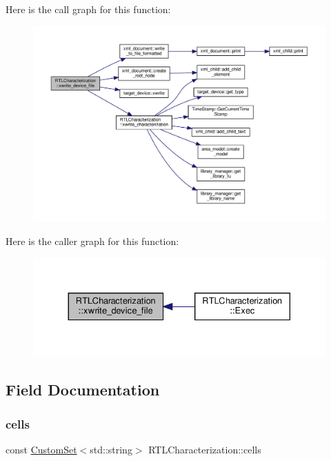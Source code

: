 Here is the call graph for this function\+:
\nopagebreak
\begin{figure}[H]
\begin{center}
\leavevmode
\includegraphics[width=350pt]{d9/d84/classRTLCharacterization_a2478484e956bec25a282ede5faaeaa88_cgraph}
\end{center}
\end{figure}
Here is the caller graph for this function\+:
\nopagebreak
\begin{figure}[H]
\begin{center}
\leavevmode
\includegraphics[width=330pt]{d9/d84/classRTLCharacterization_a2478484e956bec25a282ede5faaeaa88_icgraph}
\end{center}
\end{figure}


\subsection{Field Documentation}
\mbox{\label{classRTLCharacterization_afbefdea47835573280c058eafb3453cb}} 
\subsubsection{\texorpdfstring{cells}{cells}}
{\footnotesize\ttfamily const \hyperlink{custom__set_8hpp_a615bc2f42fc38a4bb1790d12c759e86f}{Custom\+Set}$<$std\+::string$>$ R\+T\+L\+Characterization\+::cells\hspace{0.3cm}{\ttfamily [private]}}



